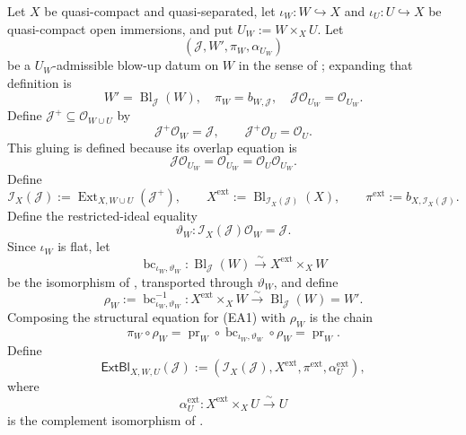 \begin{definition}
  \label{def:nagata-extended-admissible-blowup}
  \lean{}

  Let $X$ be quasi-compact and quasi-separated, let
  $\iota_W\colon W\hookrightarrow X$ and
  $\iota_U\colon U\hookrightarrow X$ be quasi-compact open immersions, and
  put $U_W:=W\times_XU$.  Let
  \[
    (\mathcal J,W',\pi_W,\alpha_{U_W})
  \]
  be a $U_W$-admissible blow-up datum on $W$ in the sense of
  ; expanding that definition is
  \[
    W'=\operatorname{Bl}_{\mathcal J}(W),\quad
    \pi_W=b_{W,\mathcal J},\quad
    \mathcal J\mathcal O_{U_W}=\mathcal O_{U_W}.
  \]
  Define $\mathcal J^+\subseteq\mathcal O_{W\cup U}$ by
  \[
    \mathcal J^+\mathcal O_W=\mathcal J,\qquad
    \mathcal J^+\mathcal O_U=\mathcal O_U.
  \]
  This gluing is defined because its overlap equation is
  \[
    \mathcal J\mathcal O_{U_W}
      =\mathcal O_{U_W}
      =\mathcal O_U\mathcal O_{U_W}.
  \]
  Define
  \[
    \mathcal I_{X}(\mathcal J)
      :=\operatorname{Ext}_{X,W\cup U}(\mathcal J^+),
    \qquad
    X^{\mathrm{ext}}
      :=\operatorname{Bl}_{\mathcal I_X(\mathcal J)}(X),
    \qquad
    \pi^{\mathrm{ext}}
      :=b_{X,\mathcal I_X(\mathcal J)}.
  \]
  Define the restricted-ideal equality
  \[
    \vartheta_W\colon
      \mathcal I_X(\mathcal J)\mathcal O_W=\mathcal J.             \tag{EA0}
  \]
  Since \(\iota_W\) is flat, let
  \[
    \operatorname{bc}_{\iota_W,\vartheta_W}\colon
      \operatorname{Bl}_{\mathcal J}(W)
        \xrightarrow{\sim}X^{\mathrm{ext}}\times_XW                \tag{EA1}
  \]
  be the isomorphism of
  , transported through
  \(\vartheta_W\), and define
  \[
    \rho_W:=\operatorname{bc}_{\iota_W,\vartheta_W}^{-1}
      \colon X^{\mathrm{ext}}\times_XW
        \xrightarrow{\sim}\operatorname{Bl}_{\mathcal J}(W)=W'.    \tag{EA2}
  \]
  Composing the structural equation for (EA1) with \(\rho_W\) is the chain
  \[
    \pi_W\circ\rho_W
      =\operatorname{pr}_W\circ
        \operatorname{bc}_{\iota_W,\vartheta_W}\circ\rho_W
      =\operatorname{pr}_W.                                      \tag{EA3}
  \]
  Define
  \[
    \mathsf{ExtBl}_{X,W,U}(\mathcal J)
      :=(\mathcal I_X(\mathcal J),X^{\mathrm{ext}},
         \pi^{\mathrm{ext}},\alpha_U^{\mathrm{ext}}),
  \]
  where
  \[
    \alpha_U^{\mathrm{ext}}\colon
      X^{\mathrm{ext}}\times_XU\xrightarrow{\sim}U
  \]
  is the complement isomorphism of
  .
\end{definition}

